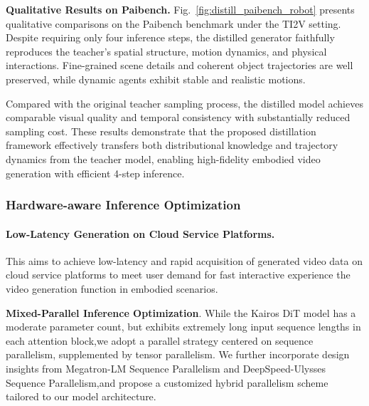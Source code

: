 \documentclass{llmxive}
\begin{document}
\textbf{Qualitative Results on Paibench.}
Fig.~\ref{fig:distill_paibench_robot} presents qualitative comparisons on the Paibench benchmark under the TI2V setting. Despite requiring only four inference steps, the distilled generator faithfully reproduces the teacher's spatial structure, motion dynamics, and physical interactions. Fine-grained scene details and coherent object trajectories are well preserved, while dynamic agents exhibit stable and realistic motions.

Compared with the original teacher sampling process, the distilled model achieves comparable visual quality and temporal consistency with substantially reduced sampling cost. These results demonstrate that the proposed distillation framework effectively transfers both distributional knowledge and trajectory dynamics from the teacher model, enabling high-fidelity embodied video generation with efficient 4-step inference.

\subsubsection{Hardware-aware Inference Optimization}

\paragraph{Low-Latency Generation on Cloud Service Platforms.}
 This aims to achieve low-latency and rapid acquisition of generated video data on cloud service platforms to meet user demand for fast interactive experience the video generation function in embodied scenarios.

\textbf {Mixed-Parallel Inference Optimization}. While the Kairos DiT model has a moderate parameter count, but exhibits extremely long input sequence lengths in each attention block,we adopt a parallel strategy centered on sequence parallelism, supplemented by tensor parallelism. We further incorporate design insights from Megatron-LM Sequence Parallelism and DeepSpeed-Ulysses Sequence Parallelism,and propose a customized hybrid parallelism scheme tailored to our model architecture.
\end{document}
